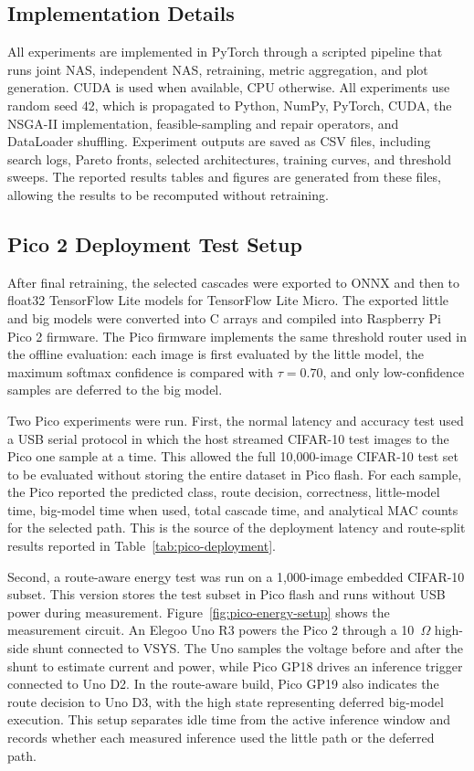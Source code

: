 \documentclass[conference]{IEEEtran}
\begin{document}
\subsection{Implementation Details}

All experiments are implemented in PyTorch through a scripted pipeline that
runs joint NAS, independent NAS, retraining, metric aggregation, and plot
generation. CUDA is used when available, CPU otherwise. All experiments use
random seed 42, which is propagated to Python, NumPy, PyTorch, CUDA, the
NSGA-II implementation, feasible-sampling and repair operators, and
DataLoader shuffling. Experiment outputs are saved as CSV files, including search logs, Pareto fronts, selected architectures, training curves, and threshold sweeps. The reported results tables and figures are generated from these files, allowing the results to be recomputed without retraining.

\subsection{Pico 2 Deployment Test Setup}

After final retraining, the selected cascades were exported to ONNX and then to
float32 TensorFlow Lite models for TensorFlow Lite Micro. The exported little
and big models were converted into C arrays and compiled into Raspberry Pi Pico
2 firmware. The Pico firmware implements the same threshold router used in the
offline evaluation: each image is first evaluated by the little model, the
maximum softmax confidence is compared with $\tau=0.70$, and only
low-confidence samples are deferred to the big model.

Two Pico experiments were run. First, the normal latency and accuracy test used
a USB serial protocol in which the host streamed CIFAR-10 test images to the
Pico one sample at a time. This allowed the full 10,000-image CIFAR-10 test set
to be evaluated without storing the entire dataset in Pico flash. For each
sample, the Pico reported the predicted class, route decision, correctness,
little-model time, big-model time when used, total cascade time, and analytical
MAC counts for the selected path. This is the source of the deployment latency
and route-split results reported in Table~\ref{tab:pico-deployment}.

Second, a route-aware energy test was run on a 1,000-image embedded CIFAR-10
subset. This version stores the test subset in Pico flash and runs without USB
power during measurement. Figure~\ref{fig:pico-energy-setup} shows the
measurement circuit. An Elegoo Uno R3 powers the Pico 2 through a 10~$\Omega$
high-side shunt connected to VSYS. The Uno samples the voltage before and after
the shunt to estimate current and power, while Pico GP18 drives an inference
trigger connected to Uno D2. In the route-aware build, Pico GP19 also indicates
the route decision to Uno D3, with the high state representing deferred
big-model execution. This setup separates idle time from the active inference
window and records whether each measured inference used the little path or the
deferred path.
\end{document}
